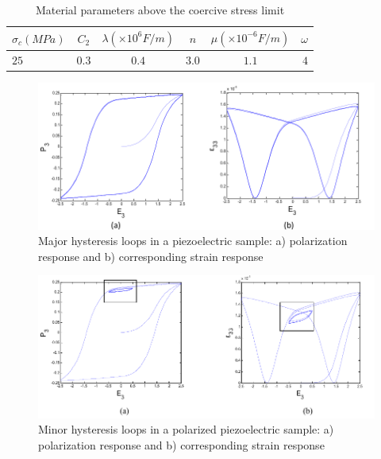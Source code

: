 \begin{table}
\caption{Material parameters above the coercive stress limit}
\centering

\begin{tabular}{l c c c c r}
\hline
$\sigma_c (MPa)$ & $C_2$ & $\lambda (\times 10 ^6 F/m)$ & $n$ & $ \mu (\times 10^{-6} F/m) $ & $\omega$ \\ \hline
$25$ & $0.3$ & $0.4$ & $3.0$ & $1.1$ & $4$ \\ \hline
\end{tabular} 
\label{table4:Material_parameters_above the_coercive_stress_limit}
\end{table}
 
\begin{figure}
\centering
\includegraphics[width=5in]{./chap_2_pol_sw/figures/majorloop_polarization_switching.pdf}
\caption{Major hysteresis loops in a piezoelectric sample: a) polarization response and b) corresponding strain response}
\label{fig:Majorhysteresisloops}
\end{figure}
 
\begin{figure}
\centering
\includegraphics[width=5in]{./chap_2_pol_sw/figures/minorloop_polarization_switching.pdf}
\caption{Minor hysteresis loops in a polarized piezoelectric sample: a) polarization response and b) corresponding strain response}
\label{fig:Manorhysteresisloops}
\end{figure} 
  
